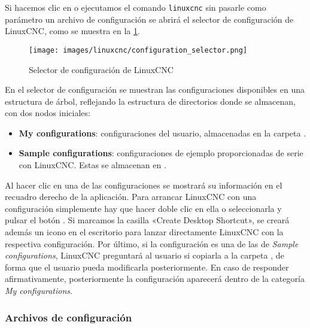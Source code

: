 \documentclass[english,spanish,a4paper,11pt]{article}
\begin{document}
Si hacemos clic en  o ejecutamos el comando \texttt{linuxcnc} sin pasarle como parámetro un archivo de configuración se abrirá el selector de configuración de LinuxCNC, como se muestra en la \cref{fig:linuxcnc_conf_selector}.

\begin{figure}[!ht]
    \centering
    \texttt{[image: images/linuxcnc/configuration\_selector.png]}
    \caption{Selector de configuración de LinuxCNC}
    \label{fig:linuxcnc_conf_selector}
\end{figure}

En el selector de configuración se muestran las configuraciones disponibles en una estructura de árbol, reflejando la estructura de directorios donde se almacenan, con dos nodos iniciales:
%
\begin{itemize}
    \item \textbf{My configurations}: configuraciones del usuario, almacenadas en la carpeta .
    
    \item \textbf{Sample configurations}: configuraciones de ejemplo proporcionadas de serie con LinuxCNC. Estas se almacenan en .
\end{itemize}

Al hacer clic en una de las configuraciones se mostrará su información en el recuadro derecho de la aplicación. Para arrancar LinuxCNC con una configuración simplemente hay que hacer doble clic en ella o seleccionarla y pulsar el botón . Si marcamos la casilla «Create Desktop Shortcut», se creará además un icono en el escritorio para lanzar directamente LinuxCNC con la respectiva configuración. Por último, si la configuración es una de las de \textit{Sample configurations}, LinuxCNC preguntará al usuario si copiarla a la carpeta , de forma que el usuario pueda modificarla posteriormente. En caso de responder afirmativamente, posteriormente la configuración aparecerá dentro de la categoría \textit{My configurations}.


\subsubsection{Archivos de configuración}
\label{sec:linuxcnc_intro_config}
\end{document}
